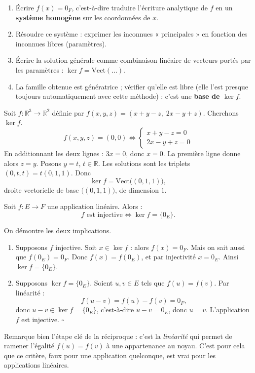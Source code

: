 \documentclass[11pt]{article}
\begin{document}
\begin{methode}
\begin{enumerate}
\item Écrire $f(x) = 0_F$, c'est-à-dire traduire l'écriture analytique de $f$ en un \textbf{système homogène} sur les coordonnées de $x$.
\item Résoudre ce système : exprimer les inconnues « principales » en fonction des inconnues libres (paramètres).
\item Écrire la solution générale comme combinaison linéaire de vecteurs portés par les paramètres : $\ker f = \mathrm{Vect}(\ldots)$.
\item La famille obtenue est génératrice ; vérifier qu'elle est libre (elle l'est presque toujours automatiquement avec cette méthode) : c'est une \textbf{base de $\ker f$}.
\end{enumerate}
\end{methode}

\begin{exemplebox}
Soit $f : \mathbb{R}^3 \to \mathbb{R}^2$ définie par $f(x,y,z) = (x + y - z,\; 2x - y + z)$. Cherchons $\ker f$.
\[ f(x,y,z) = (0,0) \iff \begin{cases} x + y - z = 0 \\ 2x - y + z = 0 \end{cases} \]
En additionnant les deux lignes : $3x = 0$, donc $x = 0$. La première ligne donne alors $z = y$. Posons $y = t$, $t \in \mathbb{R}$. Les solutions sont les triplets $(0, t, t) = t(0,1,1)$. Donc
\[ \ker f = \mathrm{Vect}\big((0,1,1)\big), \]
droite vectorielle de base $\big((0,1,1)\big)$, de dimension $1$.
\end{exemplebox}

\begin{propriete}
Soit $f : E \to F$ une application linéaire. Alors :
\[ f \text{ est injective} \iff \ker f = \{0_E\}. \]
\end{propriete}

\begin{experience}
On démontre les deux implications.
\begin{enumerate}
\item[$\Rightarrow$] Supposons $f$ injective. Soit $x \in \ker f$ : alors $f(x) = 0_F$. Mais on sait aussi que $f(0_E) = 0_F$. Donc $f(x) = f(0_E)$, et par injectivité $x = 0_E$. Ainsi $\ker f = \{0_E\}$.
\item[$\Leftarrow$] Supposons $\ker f = \{0_E\}$. Soient $u, v \in E$ tels que $f(u) = f(v)$. Par linéarité :
\[ f(u - v) = f(u) - f(v) = 0_F, \]
donc $u - v \in \ker f = \{0_E\}$, c'est-à-dire $u - v = 0_E$, donc $u = v$. L'application $f$ est injective. $\square$
\end{enumerate}
Remarque bien l'étape clé de la réciproque : c'est la \emph{linéarité} qui permet de ramener l'égalité $f(u) = f(v)$ à une appartenance au noyau. C'est pour cela que ce critère, faux pour une application quelconque, est vrai pour les applications linéaires.
\end{experience}
\end{document}
